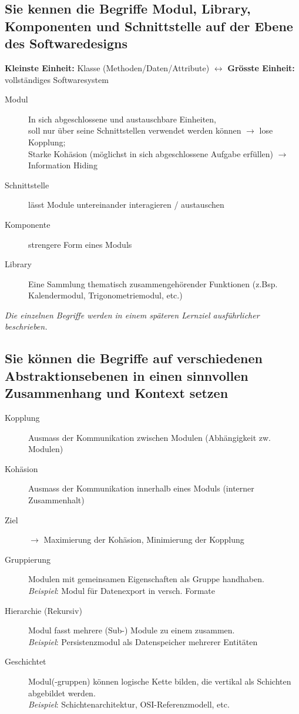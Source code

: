\documentclass[a4paper]{article}
\begin{document}
	\subsection{Sie kennen die Begriffe Modul, Library, Komponenten und Schnittstelle auf der Ebene des Softwaredesigns}
	\textbf{Kleinste Einheit:} Klasse (Methoden/Daten/Attribute) $\leftrightarrow$ \textbf{Grösste Einheit:} vollständiges Softwaresystem
	\begin{description}
		\item[Modul] In sich abgeschlossene und austauschbare Einheiten, \\
		soll nur über seine Schnittstellen verwendet werden können $\rightarrow$ lose Kopplung; \\
		Starke Kohäsion (möglichst in sich abgeschlossene Aufgabe erfüllen) $\rightarrow$ Information Hiding
		\item[Schnittstelle] lässt Module untereinander interagieren / austauschen
		\item[Komponente] strengere Form eines Moduls
		\item[Library] Eine Sammlung thematisch zusammengehörender Funktionen (z.Bsp. Kalendermodul, Trigonometriemodul, etc.)
	\end{description}
	\textit{Die einzelnen Begriffe werden in einem späteren Lernziel ausführlicher beschrieben.}
	
	\subsection{Sie können die Begriffe auf verschiedenen Abstraktionsebenen in einen sinnvollen Zusammenhang und Kontext setzen}
	\begin{description}
		\item[Kopplung] Ausmass der Kommunikation zwischen Modulen (Abhängigkeit zw. Modulen)
		\item[Kohäsion] Ausmass der Kommunikation innerhalb eines Moduls (interner Zusammenhalt)
		\item[Ziel] $\rightarrow$ Maximierung der Kohäsion, Minimierung der Kopplung
	\end{description}
	\begin{description}
		\item[Gruppierung] Modulen mit gemeinsamen Eigenschaften als Gruppe handhaben. \\
			\textit{Beispiel}: Modul für Datenexport in versch. Formate
		\item[Hierarchie (Rekursiv)] Modul fasst mehrere (Sub-) Module zu einem zusammen. \\
			\textit{Beispiel}: Persistenzmodul als Datenspeicher mehrerer Entitäten
		\item[Geschichtet] Modul(-gruppen) können logische Kette bilden, die vertikal als Schichten abgebildet werden. \\
			\textit{Beispiel}: Schichtenarchitektur, OSI-Referenzmodell, etc.
	\end{description}
	
\end{document}

